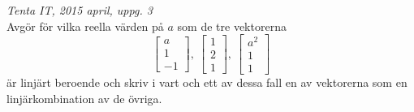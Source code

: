{\it Tenta IT, 2015 april, uppg. 3}\\
Avgör för vilka reella värden på $a$ som de tre vektorerna
$$\begin{bmatrix}a\\1\\-1\end{bmatrix},\ \begin{bmatrix}1\\2\\1\end{bmatrix},\ \begin{bmatrix}a^2\\1\\1\end{bmatrix}$$
är linjärt beroende och skriv i vart och ett av dessa fall en av vektorerna som en linjärkombination av de övriga.